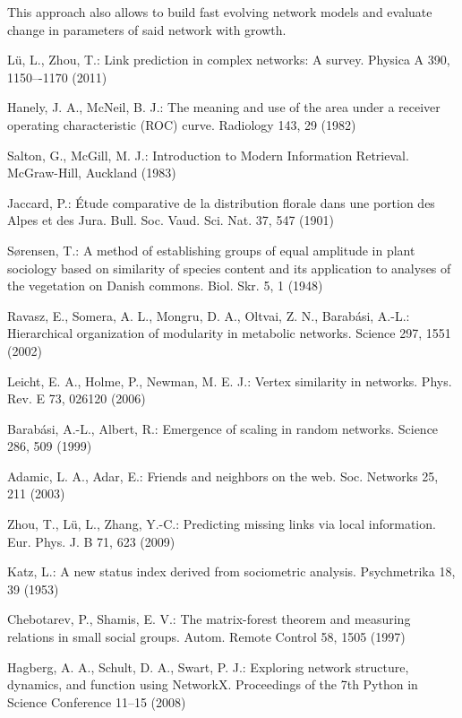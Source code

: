 \documentclass{llncs}
\begin{document}
This approach also allows to build fast evolving network models and evaluate change in parameters of said network with growth.
%
%
%
\begin{thebibliography}{28}

L{\"u}, L., Zhou, T.:
Link prediction in complex networks: A survey.
Physica A 390, 1150–-1170 (2011)

Hanely, J. A., McNeil, B. J.:
The meaning and use of the area under a receiver operating characteristic (ROC) curve.
Radiology 143, 29 (1982)

Salton, G., McGill, M. J.:
Introduction to Modern Information Retrieval.
McGraw-Hill, Auckland (1983)

Jaccard, P.:
{\'E}tude comparative de la distribution florale dans une portion des Alpes et des Jura.
Bull. Soc. Vaud. Sci. Nat. 37, 547 (1901)

S{\o}rensen, T.: 
A method of establishing groups of equal amplitude in plant sociology based on similarity of species content and its application to analyses of the vegetation on Danish commons.
Biol. Skr. 5, 1 (1948)

Ravasz, E., Somera, A. L., Mongru, D. A., Oltvai, Z. N., Barab{\'a}si, A.-L.:
Hierarchical organization of modularity in metabolic networks. 
Science 297, 1551 (2002)

Leicht, E. A., Holme, P., Newman, M. E. J.:
Vertex similarity in networks.
Phys. Rev. E 73, 026120 (2006)

Barab{\'a}si, A.-L., Albert, R.:
Emergence of scaling in random networks.
Science 286, 509 (1999)

Adamic, L. A., Adar, E.:
Friends and neighbors on the web.
Soc. Networks 25, 211 (2003)

Zhou, T., L{\"u}, L., Zhang, Y.-C.:
Predicting missing links via local information.
Eur. Phys. J. B 71, 623 (2009)

Katz, L.:
A new status index derived from sociometric analysis.
Psychmetrika 18, 39 (1953)

Chebotarev, P., Shamis, E. V.:
The matrix-forest theorem and measuring relations in small social groups.
Autom. Remote Control 58, 1505 (1997)

Hagberg, A. A., Schult, D. A., Swart, P. J.: 
Exploring network structure, dynamics, and function using NetworkX.
Proceedings of the 7th Python in Science Conference 11--15 (2008)


\end{thebibliography}
\end{document}
